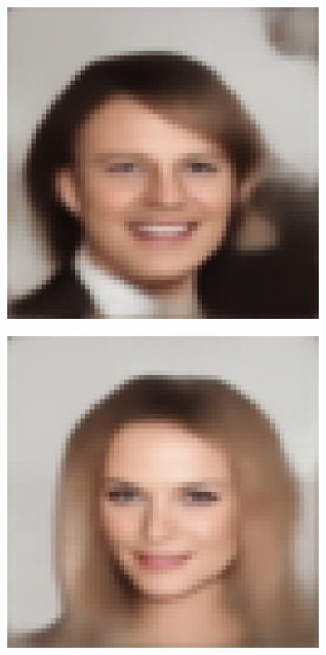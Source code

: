 \documentclass{IEEEcsmag}
\begin{document}
\begin{figure}[ht]
    \smallskip
    \setcounter{subfigure}{0}

    \begin{subfigure}{0.12\textwidth}
        \includegraphics[width=\linewidth]{images/CelebA/1/simple_ae_4.png}
    \end{subfigure}
    \begin{subfigure}{0.12\textwidth}
        \includegraphics[width=\linewidth]{images/CelebA/1/simple_ae_2.png}

\end{subfigure}
\end{figure}
\end{document}
